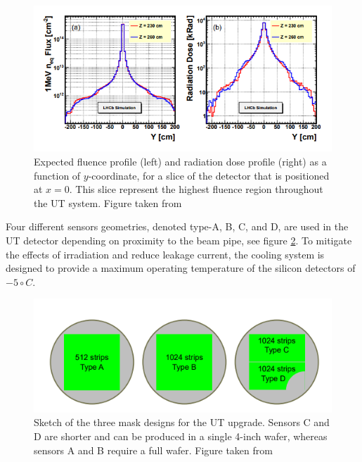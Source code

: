  \begin{figure}[!h]
\centering
\includegraphics{figures/UT_dose.PNG}
\caption{Expected fluence profile (left) and radiation dose profile (right) as a function of $y$-coordinate, for a slice of the detector that is positioned at $x=0$. This slice represent the highest fluence region throughout the UT system. Figure taken from \cite{upgrade_tracker_tdr}
\label{fig:UT_dose}}
\end{figure}

 
 Four different sensors geometries, denoted type-A, B, C, and D, are used in the UT detector depending on proximity to the beam pipe, see figure \ref{fig:UT_sensors}. To mitigate the effects of irradiation and reduce leakage current, the cooling system is designed to provide a maximum operating temperature of the silicon detectors of $-5\circ C$. 
 
 
 
 \begin{figure}[!h]
\centering
\includegraphics{figures/UT_sensors.PNG}
\caption{Sketch of the three mask designs for the UT upgrade. Sensors C and D are shorter and
can be produced in a single 4-inch wafer, whereas sensors A and B require a full wafer.  Figure taken from \cite{upgrade_tracker_tdr}
\label{fig:UT_sensors}}
\end{figure}
 
